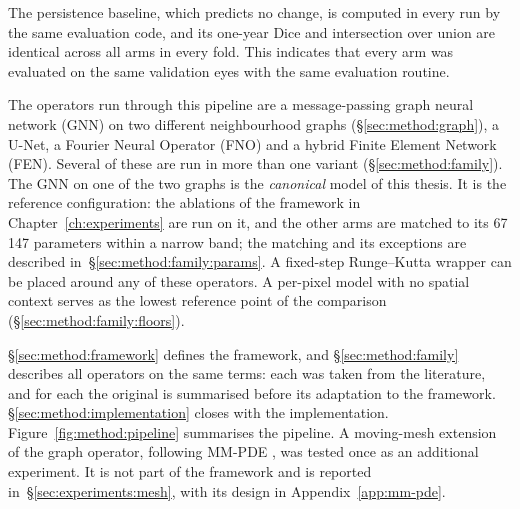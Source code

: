 The persistence baseline, which predicts no change, is computed in every
run by the same evaluation code, and its one-year Dice and intersection over union are
identical across all arms in every fold. This indicates that every arm was
evaluated on the same validation eyes with the same evaluation routine.

The operators run through this pipeline are a message-passing graph
neural network (GNN) on two different neighbourhood graphs
(\S\ref{sec:method:graph}), a U-Net, a Fourier Neural Operator (FNO) and a
hybrid Finite Element Network (FEN). Several of these are run in more than
one variant (\S\ref{sec:method:family}). The GNN on one of the two graphs
is the \emph{canonical} model of this thesis. It is the reference
configuration: the ablations of the framework in
Chapter~\ref{ch:experiments} are run on it, and the other arms are matched
to its 67\,147 parameters within a narrow band; the matching and its
exceptions are described in~\S\ref{sec:method:family:params}. A
fixed-step Runge--Kutta wrapper can be placed around any of these
operators. A per-pixel model with no spatial context serves as the lowest
reference point of the comparison (\S\ref{sec:method:family:floors}).

\S\ref{sec:method:framework} defines the framework, and
\S\ref{sec:method:family} describes all operators on the same terms: each was taken from the literature, and for each the
original is summarised before its adaptation to the framework.
\S\ref{sec:method:implementation} closes with the implementation.
Figure~\ref{fig:method:pipeline} summarises the pipeline.
A moving-mesh extension of the graph operator, following MM-PDE
\citep{Hu2024}, was tested once as an additional experiment. It is not
part of the framework and is reported in~\S\ref{sec:experiments:mesh},
with its design in Appendix~\ref{app:mm-pde}.

